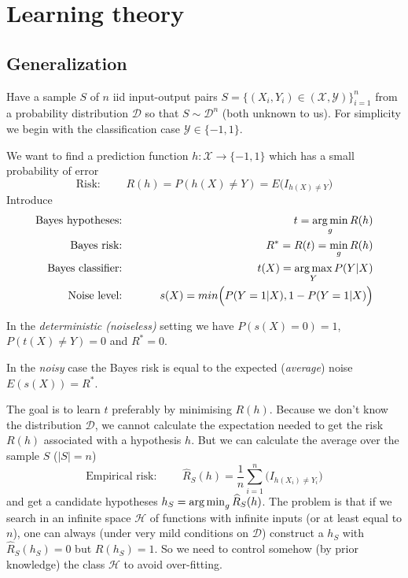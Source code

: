\clearpage

\section{Learning theory}

\subsection{Generalization}

Have a sample $S$ of $n$ iid input-output pairs $S = \{ (X_i,Y_i) \in (\mathcal{X},\mathcal{Y}) \}_{i=1}^n$ from a probability distribution $\mathcal{D}$ so that $S \sim \mathcal{D}^n$  (both unknown to us).
For simplicity we begin with the classification case $\mathcal{Y} \in \{-1,1\}$.

We want to find a prediction function $h : \mathcal{X} \to \{-1,1\}$ which has a small probability of error
\begin{equation}
\text{Risk: } \qquad R(h) = P(h(X) \neq Y) = E \Big( I_{h(X) \neq Y} \Big)
\end{equation}
Introduce
\begin{eqnarray}
\text{Bayes hypotheses: } & \qquad & t = \operatorname*{arg\,min}_g R(h) \\
\text{Bayes risk: } & \qquad & R^* = R(t) = \min_g R(h) \\
\text{Bayes classifier: } & \qquad & t(X) = \operatorname*{arg\,max}_Y P(Y|X) \\
\text{Noise level: } & \qquad & s(X) = min \Big( P(Y=1|X), 1 - P(Y = 1|X) \Big)
\end{eqnarray}

In the \emph{deterministic (noiseless)} setting we have $P(s(X)=0)=1$, $P(t(X) \neq Y) = 0$ and $R^* = 0$.

In the \emph{noisy} case the Bayes risk is equal to the expected (\emph{average}) noise $E(s(X)) = R^*$.

The goal is to learn $t$ preferably by minimising $R(h)$.
Because we don't know the distribution $\mathcal{D}$, we cannot calculate the expectation needed to get the risk $R(h)$ associated with a hypothesis $h$. 
But we can calculate the average over the sample $S$ ($|S| = n$)
\begin{equation}
\text{Empirical risk: } \qquad \widehat{R}_S(h) = \frac{1}{n} \sum_{i=1}^n \Big( I_{h(X_i) \neq Y_i} \Big)
\end{equation}
and get a candidate hypotheses $h_S = \operatorname*{arg\,min}_g \widehat{R}_S(h)$.
The problem is that if we search in an infinite space $\mathcal{H}$ of functions with infinite inputs (or at least equal to $n$), one can always (under very mild conditions on $\mathcal{D}$) construct a $h_S$ with $\widehat{R}_S(h_S)=0$ but $R(h_S) = 1$.
So we need to control somehow (by prior knowledge) the class $\mathcal{H}$ to avoid over-fitting.


